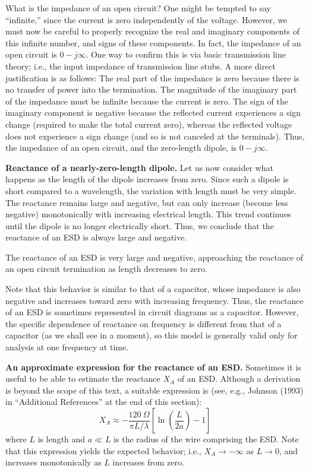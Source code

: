 What is the impedance of an open circuit?
One might be tempted to say ``infinite,'' since the current is zero independently of the voltage.
However, we must now be careful to properly recognize the real and imaginary components of this infinite number, and signs of these components.
In fact, the impedance of an open circuit is $0-j\infty$. 
One way to confirm this is via basic transmission line theory; i.e., the input impedance of transmission line stubs.
A more direct justification is as follows: 
The real part of the impedance is zero because there is no transfer of power into the termination.
The magnitude of the imaginary part of the impedance must be infinite because the current is zero.  
The sign of the imaginary component is negative because the reflected current experiences a sign change (required to make the total current zero), whereas the reflected voltage does not experience a sign change (and so is not canceled at the terminals). 
Thus, the impedance of an open circuit, and the zero-length dipole, is $0-j\infty$.

{\bf Reactance of a nearly-zero-length dipole.}
Let us now consider what happens as the length of the dipole increases from zero.
Since such a dipole is short compared to a wavelength, the variation with length must be very simple.
The reactance remains large and negative, but can only increase (become less negative) monotonically with increasing electrical length. 
This trend continues until the dipole is no longer electrically short.
Thus, we conclude that the reactance of an ESD is always large and negative.
%
\begin{mdframed}[backgroundcolor=yellow!20,nobreak=true] 
The reactance of an ESD is very large and negative, approaching the reactance of an open circuit termination as length decreases to zero. 
\end{mdframed}

Note that this behavior is similar to that of a capacitor, whose impedance is also negative and increases toward zero with increasing frequency.
Thus, the reactance of an ESD is sometimes represented in circuit diagrams as a capacitor. 
However, the specific dependence of reactance on frequency is different from that of a capacitor (as we shall see in a moment), so this model is generally valid only for analysis at one frequency at time.

{\bf An approximate expression for the reactance of an ESD.}
Sometimes it is useful to be able to estimate the reactance $X_A$ of an ESD.  
Although a derivation is beyond the scope of this text, a suitable expression is (see, e.g., Johnson (1993) in ``Additional References'' at the end of this section):
%
\begin{equation}
X_A \approx -\frac{120~\Omega}{\pi L/\lambda} \left[ \ln{\left(\frac{L}{2a}\right)}-1 \right]
\label{m0210_eXA}
\end{equation}
%
where $L$ is length and $a\ll L$ is the radius of the wire comprising the ESD.
Note that this expression yields the expected behavior; i.e., $X_A\rightarrow-\infty$ as $L \rightarrow 0$, and increases monotonically as $L$ increases from zero.

